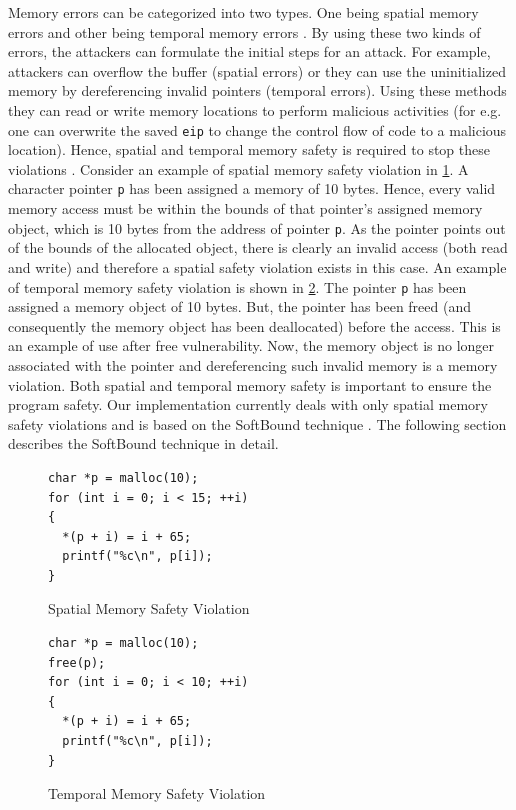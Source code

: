 Memory errors can be categorized into two types. One being spatial memory errors and other being temporal memory errors \citep{6547101}. By using these two kinds of errors, the attackers can formulate the initial steps for an attack. For example, attackers can overflow the buffer (spatial errors) or they can use the uninitialized memory by dereferencing invalid pointers (temporal errors). Using these methods they can read or write memory locations to perform malicious activities (for e.g. one can overwrite the saved \texttt{eip} to change the control flow of code to a malicious location). Hence, spatial and temporal memory safety is required to stop these violations \citep{memsafetymatpayer}. Consider an example of spatial memory safety violation in \cref{fig:fig21}. A character pointer \texttt{p} has been assigned a memory of 10 bytes. Hence, every valid memory access must be within the bounds of that pointer's assigned memory object, which is 10 bytes from the address of pointer \texttt{p}. As the pointer points out of the bounds of the allocated object, there is clearly an invalid access (both read and write) and therefore a spatial safety violation exists in this case. An example of temporal memory safety violation is shown in \cref{fig:fig22}. The pointer \texttt{p} has been assigned a memory object of 10 bytes. But, the pointer has been freed (and consequently the memory object has been deallocated) before the access. This is an example of use after free \citep{cwe416} vulnerability. Now, the memory object is no longer associated with the pointer and dereferencing such invalid memory is a memory violation. Both spatial and temporal memory safety is important to ensure the program safety. Our implementation currently deals with only spatial memory safety violations and is based on the SoftBound technique \citep{nagarakatte2009softbound}. The following section describes the SoftBound technique in detail.

\begin{figure}
\begin{centering}
\begin{lstlisting}
char *p = malloc(10);
for (int i = 0; i < 15; ++i)
{
  *(p + i) = i + 65;
  printf("%c\n", p[i]);
}
\end{lstlisting}
\caption{Spatial Memory Safety Violation\label{fig:fig21}}
\par\end{centering}
\end{figure}

\begin{figure}
\begin{centering}
\begin{lstlisting}
char *p = malloc(10);
free(p);
for (int i = 0; i < 10; ++i)
{
  *(p + i) = i + 65;
  printf("%c\n", p[i]);
}
\end{lstlisting}
\caption{Temporal Memory Safety Violation\label{fig:fig22}}
\par\end{centering}
\end{figure}

